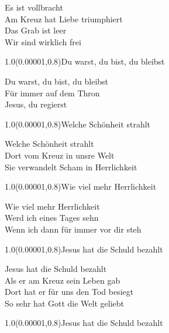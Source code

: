 \documentclass[aspectratio=169]{beamer}
\begin{document}
\begin{frame}
\centering
\color{white}
\huge{Es ist vollbracht} \\
\huge{Am Kreuz hat Liebe triumphiert} \\
\huge{Das Grab ist leer} \\
\huge{Wir sind wirklich frei} \\

\begin{textblock}{1.0}(0.00001,0.8)\color{gray}\normalsize{Du warst, du bist, du bleibst}\end{textblock}
\end{frame}

\begin{frame}
\centering
\color{white}
\huge{Du warst, du bist, du bleibst} \\
\huge{Für immer auf dem Thron} \\
\huge{Jesus, du regierst} \\

\begin{textblock}{1.0}(0.00001,0.8)\color{gray}\normalsize{Welche Schönheit strahlt}\end{textblock}
\end{frame}

\begin{frame}
\centering
\color{white}
\huge{Welche Schönheit strahlt} \\
\huge{Dort vom Kreuz in unsre Welt} \\
\huge{Sie verwandelt Scham in Herrlichkeit} \\

\begin{textblock}{1.0}(0.00001,0.8)\color{gray}\normalsize{Wie viel mehr Herrlichkeit}\end{textblock}
\end{frame}

\begin{frame}
\centering
\color{white}
\huge{Wie viel mehr Herrlichkeit} \\
\huge{Werd ich eines Tages sehn} \\
\huge{Wenn ich dann für immer vor dir steh} \\

\begin{textblock}{1.0}(0.00001,0.8)\color{gray}\normalsize{Jesus hat die Schuld bezahlt}\end{textblock}
\end{frame}

\begin{frame}
\centering
\color{white}
\huge{Jesus hat die Schuld bezahlt} \\
\huge{Als er am Kreuz sein Leben gab} \\
\huge{Dort hat er für uns den Tod besiegt} \\
\huge{So sehr hat Gott die Welt geliebt} \\

\begin{textblock}{1.0}(0.00001,0.8)\color{gray}\normalsize{Jesus hat die Schuld bezahlt}\end{textblock}
\end{frame}
\end{document}
